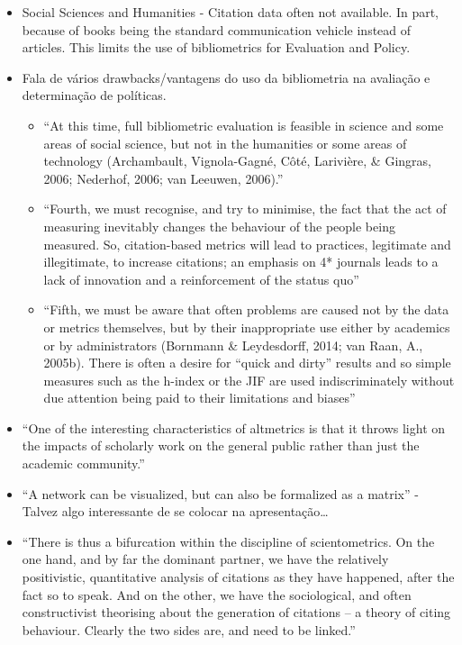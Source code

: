 \documentclass[11pt]{article}
\begin{document}
\begin{itemize}
\item Social Sciences and Humanities - Citation data often not available. In part, because of books being the standard communication vehicle instead of articles. This limits the use of bibliometrics for Evaluation and Policy.
\item Fala de vários drawbacks/vantagens do uso da bibliometria na avaliação e determinação de políticas.
\begin{itemize}
\item ``At this time, full bibliometric evaluation is feasible in science and some areas of social science, but not in the humanities or some areas of technology (Archambault, Vignola-Gagné, Côté, Larivière, \& Gingras, 2006; Nederhof, 2006; van Leeuwen, 2006).''
\item ``Fourth, we must recognise, and try to minimise, the fact that the act of measuring inevitably changes the behaviour of the people being measured. So, citation-based metrics will lead to practices, legitimate and illegitimate, to increase citations; an emphasis on 4* journals leads to a lack of innovation and a reinforcement of the status quo''
\item ``Fifth, we must be aware that often problems are caused not by the data or metrics themselves, but by their inappropriate use either by academics or by administrators (Bornmann \& Leydesdorff, 2014; van Raan, A., 2005b). There is often a desire for “quick and dirty” results and so simple measures such as the h-index or the JIF are used indiscriminately without due attention being paid to their limitations and biases''
\end{itemize}
\item ``One of the interesting characteristics of altmetrics is that it throws light on the impacts of scholarly work on the general public rather than just the academic community.''
\item ``A network can be visualized, but can also be formalized as a matrix'' - Talvez algo interessante de se colocar na apresentação\ldots{}
\item ``There is thus a bifurcation within the discipline of scientometrics. On the one hand, and by far the dominant partner, we have the relatively positivistic, quantitative analysis of citations as they have happened, after the fact so to speak. And on the other, we have the sociological, and often constructivist theorising about the generation of citations – a theory of citing behaviour. Clearly the two sides are, and need to be linked.''
\end{itemize}
\end{document}
